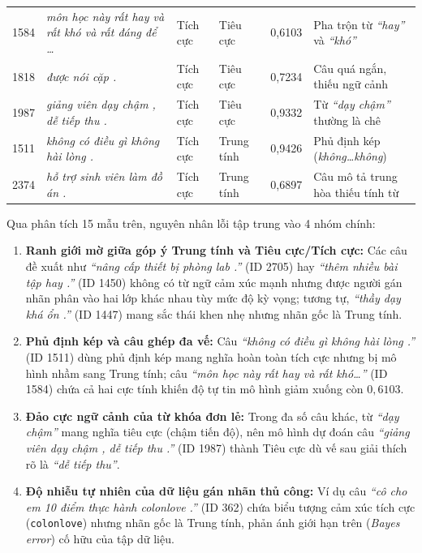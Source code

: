 \documentclass[12pt,a4paper]{article}
\begin{document}
\begin{table}[htbp]
\begin{tabularx}{\textwidth}{|r|>{\raggedright\arraybackslash}X|l|l|c|p{3.0cm}|}
\hline
1584 & \textit{môn học này rất hay và rất khó và rất đáng để \dots} & Tích cực & Tiêu cực & 0,6103 & Pha trộn từ \textit{``hay''} và \textit{``khó''} \\
1818 & \textit{được nói cặp .} & Tích cực & Tiêu cực & 0,7234 & Câu quá ngắn, thiếu ngữ cảnh \\
1987 & \textit{giảng viên dạy chậm , dễ tiếp thu .} & Tích cực & Tiêu cực & 0,9332 & Từ \textit{``dạy chậm''} thường là chê \\
1511 & \textit{không có điều gì không hài lòng .} & Tích cực & Trung tính & 0,9426 & Phủ định kép (\textit{không\dots không}) \\
2374 & \textit{hỗ trợ sinh viên làm đồ án .} & Tích cực & Trung tính & 0,6897 & Câu mô tả trung hòa thiếu tính từ \\
\hline
\end{tabularx}
\end{table}

Qua phân tích 15 mẫu trên, nguyên nhân lỗi tập trung vào 4 nhóm chính:
\begin{enumerate}
    \item \textbf{Ranh giới mờ giữa góp ý Trung tính và Tiêu cực/Tích cực:} Các câu đề xuất như \textit{``nâng cấp thiết bị phòng lab .''} (ID 2705) hay \textit{``thêm nhiều bài tập hay .''} (ID 1450) không có từ ngữ cảm xúc mạnh nhưng được người gán nhãn phân vào hai lớp khác nhau tùy mức độ kỳ vọng; tương tự, \textit{``thầy dạy khá ổn .''} (ID 1447) mang sắc thái khen nhẹ nhưng nhãn gốc là Trung tính.
    \item \textbf{Phủ định kép và câu ghép đa vế:} Câu \textit{``không có điều gì không hài lòng .''} (ID 1511) dùng phủ định kép mang nghĩa hoàn toàn tích cực nhưng bị mô hình nhầm sang Trung tính; câu \textit{``môn học này rất hay và rất khó\dots''} (ID 1584) chứa cả hai cực tính khiến độ tự tin mô hình giảm xuống còn $0{,}6103$.
    \item \textbf{Đảo cực ngữ cảnh của từ khóa đơn lẻ:} Trong đa số câu khác, từ \textit{``dạy chậm''} mang nghĩa tiêu cực (chậm tiến độ), nên mô hình dự đoán câu \textit{``giảng viên dạy chậm , dễ tiếp thu .''} (ID 1987) thành Tiêu cực dù vế sau giải thích rõ là \textit{``dễ tiếp thu''}.
    \item \textbf{Độ nhiễu tự nhiên của dữ liệu gán nhãn thủ công:} Ví dụ câu \textit{``cô cho em 10 điểm thực hành colonlove .''} (ID 362) chứa biểu tượng cảm xúc tích cực (\texttt{colonlove}) nhưng nhãn gốc là Trung tính, phản ánh giới hạn trên (\textit{Bayes error}) cố hữu của tập dữ liệu.
\end{enumerate}
\end{document}
